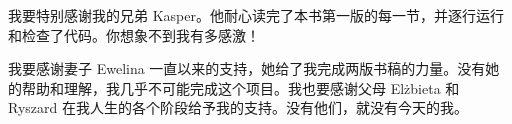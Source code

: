 我要特别感谢我的兄弟 Kasper。他耐心读完了本书第一版的每一节，并逐行运行和检查了代码。你想象不到我有多感激！

我要感谢妻子 Ewelina 一直以来的支持，她给了我完成两版书稿的力量。没有她的帮助和理解，我几乎不可能完成这个项目。我也要感谢父母 Elżbieta 和 Ryszard 在我人生的各个阶段给予我的支持。没有他们，就没有今天的我。

